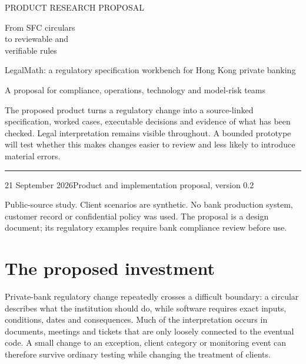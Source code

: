 \documentclass[11pt,a4paper]{article}
\begin{document}
\hypersetup{pageanchor=false}
\begin{titlepage}
\vspace*{20mm}
{\sffamily\color{teal}\large PRODUCT RESEARCH PROPOSAL\par}
\vspace{9mm}
{\sffamily\bfseries\color{navy}\fontsize{31}{36}\selectfont\raggedright From SFC circulars\\to reviewable and\\verifiable rules\par}
\vspace{9mm}
{\Large LegalMath: a regulatory specification workbench for Hong Kong private banking\par}
\vspace{14mm}
{\large A proposal for compliance, operations, technology and model-risk teams\par}
\vfill
\begin{minipage}{0.91\textwidth}
The proposed product turns a regulatory change into a source-linked specification,
worked cases, executable decisions and evidence of what has been checked. Legal
interpretation remains visible throughout. A bounded prototype will test whether
this makes changes easier to review and less likely to introduce material errors.
\end{minipage}
\vspace{18mm}
\hrule
\vspace{5mm}
21 September 2026\hfill Product and implementation proposal, version 0.2\par
\small Public-source study. Client scenarios are synthetic. No bank production
system, customer record or confidential policy was used. The proposal is a design
document; its regulatory examples require bank compliance review before use.
\end{titlepage}
\hypersetup{pageanchor=true}

\section*{The proposed investment}
Private-bank regulatory change repeatedly crosses a difficult boundary: a circular
describes what the institution should do, while software requires exact inputs,
conditions, dates and consequences. Much of the interpretation occurs in documents,
meetings and tickets that are only loosely connected to the eventual code. A small
change to an exception, client category or monitoring event can therefore survive
ordinary testing while changing the treatment of clients.
\end{document}
